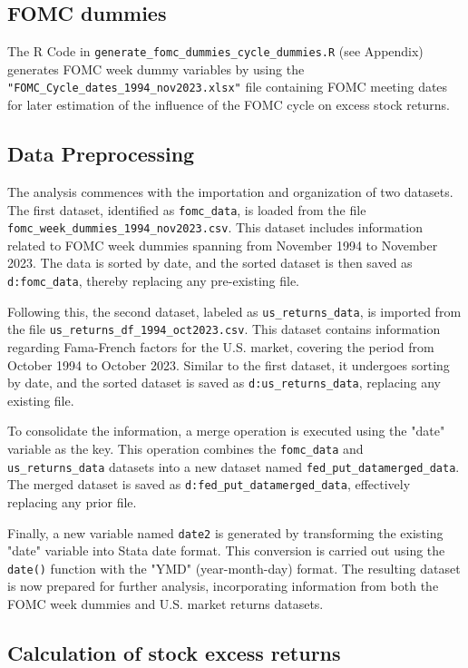 \subsection{FOMC dummies}

The R Code in \texttt{generate\_fomc\_dummies\_cycle\_dummies.R} (see Appendix)
generates FOMC week dummy variables by using the \texttt{"FOMC\_Cycle\_dates\_1994\_nov2023.xlsx"} file containing FOMC meeting dates for later estimation of the influence of the FOMC cycle on excess stock returns.

\subsection{Data Preprocessing}

The analysis commences with the importation and organization of two datasets. 
The first dataset, identified as \texttt{fomc\_data}, is loaded from the file \texttt{fomc\_week\_dummies\_1994\_nov2023.csv}. 
This dataset includes information related to FOMC week dummies spanning from November 1994 to November 2023. The data is sorted by date, and the sorted dataset is then saved as \texttt{d:fomc\_data}, thereby replacing any pre-existing file.

Following this, the second dataset, labeled as \texttt{us\_returns\_data}, is imported from the file \texttt{us\_returns\_df\_1994\_oct2023.csv}. This dataset contains information regarding Fama-French factors for the U.S. market, covering the period from October 1994 to October 2023. Similar to the first dataset, it undergoes sorting by date, and the sorted dataset is saved as \texttt{d:us\_returns\_data}, replacing any existing file.

To consolidate the information, a merge operation is executed using the "date" variable as the key. This operation combines the \texttt{fomc\_data} and \texttt{us\_returns\_data} datasets into a new dataset named \texttt{fed\_put\_datamerged\_data}. The merged dataset is saved as \texttt{d:fed\_put\_datamerged\_data}, effectively replacing any prior file.

Finally, a new variable named \texttt{date2} is generated by transforming the existing "date" variable into Stata date format. This conversion is carried out using the \texttt{date()} function with the "YMD" (year-month-day) format. The resulting dataset is now prepared for further analysis, incorporating information from both the FOMC week dummies and U.S. market returns datasets.

\subsection{Calculation of stock excess returns}

